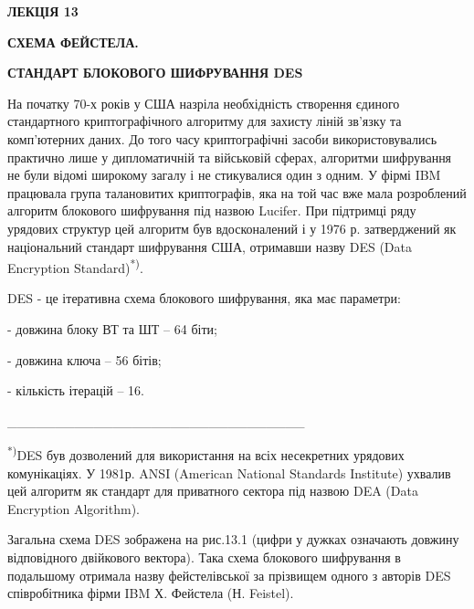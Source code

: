 \documentclass[a4paper]{article}
\newcounter{}
\begin{document}
\bigskip


\bigskip

{\bfseries
ЛЕКЦІЯ  13}


\bigskip

{\centering\bfseries
СХЕМА  ФЕЙСТЕЛА. 
\par}

{\centering\bfseries
СТАНДАРТ  БЛОКОВОГО  ШИФРУВАННЯ  DES
\par}


\bigskip


\bigskip

На початку 70-х років у США назріла необхідність створення єдиного стандартного
криптографічного алгоритму для захисту ліній зв’язку та комп’ютерних даних. До
того часу криптографічні засоби використовувались практично лише у
дипломатичній та військовій сферах, алгоритми шифрування не були відомі
широкому загалу і не стикувалися один з одним. У фірмі IBM працювала група
талановитих криптографів, яка на той час вже мала розроблений алгоритм
блокового шифрування під назвою Lucifer. При підтримці ряду урядових структур
цей алгоритм був вдосконалений і у 1976 р.  затверджений як  національний
стандарт шифрування США, отримавши назву DES (Data Encryption
Standard)\textsuperscript{*)}. 

DES -  це ітеративна схема блокового шифрування, яка має параметри:

 {}- довжина блоку ВТ та ШТ – 64 біти;

 {}- довжина ключа – 56 бітів;

 {}- кількість ітерацій – 16. 


\bigskip

\_\_\_\_\_\_\_\_\_\_\_\_\_\_\_\_\_\_\_\_\_\_\_\_\_\_\_\_\_\_\_

\textsuperscript{ *)}DES був дозволений для використання на всіх несекретних
урядових комунікаціях. У 1981р. ANSI (American National Standards Institute)
ухвалив цей алгоритм як стандарт для приватного сектора під назвою DEA (Data
Encryption Algorithm).   

Загальна схема DES зображена на рис.13.1 (цифри у дужках означають довжину
відповідного двійкового вектора). Така схема блокового шифрування  в подальшому
отримала назву фейстелівської за прізвищем одного з  авторів DES співробітника
фірми IBM Х. Фейстела (Н. Feistel).
\end{document}
